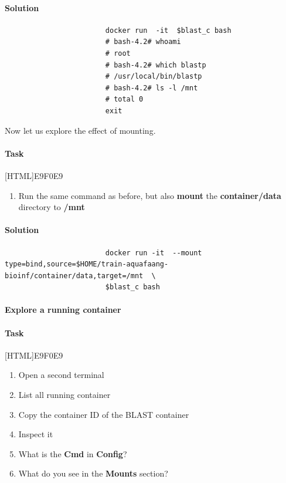 \documentclass[12pt]{article}
\begin{document}
			\paragraph{Solution}	
	
				\begin{minipage}{\linewidth}			
					\begin{lstlisting}
						docker run  -it  $blast_c bash
						# bash-4.2# whoami
						# root
						# bash-4.2# which blastp
						# /usr/local/bin/blastp
						# bash-4.2# ls -l /mnt
						# total 0
						exit
					\end{lstlisting}
				\end{minipage}	
			
				Now let us explore the effect of mounting.
			
				\paragraph{Task}
					[HTML]{E9F0E9}{\parbox{\linewidth}{%
							\begin{enumerate}
								\item 	Run the same command as before, but also \textbf{mount} the \textbf{container/data} directory to \textbf{/mnt} 
							\end{enumerate}
					}}
	
				\paragraph{Solution}	
		
					\begin{minipage}{\linewidth}
						\begin{lstlisting}
						docker run -it 	--mount type=bind,source=$HOME/train-aquafaang-bioinf/container/data,target=/mnt  \
						$blast_c bash
					\end{lstlisting}
				\end{minipage}
			
 			\paragraph{Explore a running container}
		
	
			\paragraph{Task}
				[HTML]{E9F0E9}{\parbox{\linewidth}{%
						\begin{enumerate}
							\item Open a second terminal
							\item List all running container
							\item Copy the container ID of the BLAST container
							\item Inspect it
							\item What is the \textbf{Cmd} in \textbf{Config}?
							\item  What do you see in the \textbf{Mounts} section?
						\end{enumerate}
				}}
\end{document}
